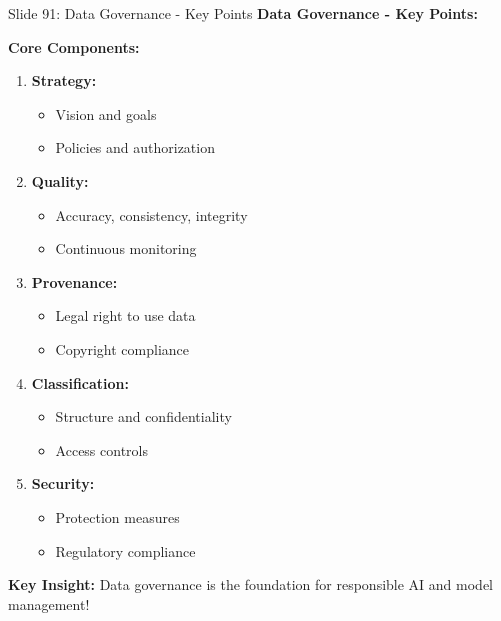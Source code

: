 \documentclass[8pt]{beamer}
\begin{document}
	\begin{frame}{Slide 91: Data Governance - Key Points}
		\fontsize{6.5}{7.5}\selectfont
		\textbf{Data Governance - Key Points:}
		
		\vspace{0.1cm}
		\textbf{Core Components:}
		\begin{enumerate}
			\item \textbf{Strategy:}
			\begin{itemize}
				\item Vision and goals
				\item Policies and authorization
			\end{itemize}
			\item \textbf{Quality:}
			\begin{itemize}
				\item Accuracy, consistency, integrity
				\item Continuous monitoring
			\end{itemize}
			\item \textbf{Provenance:}
			\begin{itemize}
				\item Legal right to use data
				\item Copyright compliance
			\end{itemize}
			\item \textbf{Classification:}
			\begin{itemize}
				\item Structure and confidentiality
				\item Access controls
			\end{itemize}
			\item \textbf{Security:}
			\begin{itemize}
				\item Protection measures
				\item Regulatory compliance
			\end{itemize}
		\end{enumerate}
		
		\textcolor{myblue}{\textbf{Key Insight:}} Data governance is the \textcolor{myblue}{foundation for responsible AI and model management}!
	\end{frame}
	
\end{document}
